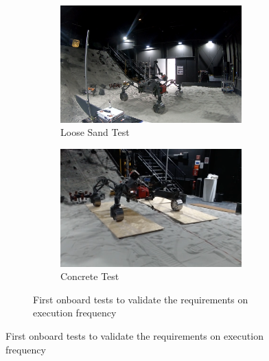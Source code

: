 \documentclass{article}
\begin{document}
\begin{figure}[!htb]
\begin{figure}[!htb]
    \centering
    \begin{subfigure}[t]{0.45\textwidth}
        \includegraphics[width=\textwidth]{../figures/spacehall.png}
        \caption{Loose Sand Test}
    \end{subfigure}
    \begin{subfigure}[t]{0.45\textwidth}
        \includegraphics[width=\textwidth]{../figures/spacehallconcrete.png}
        \caption{Concrete Test}
    \end{subfigure}
    \caption{First onboard tests to validate the requirements on execution frequency}
    \label{fig:sh-tests}
\end{figure}


\end{figure}
\end{document}
